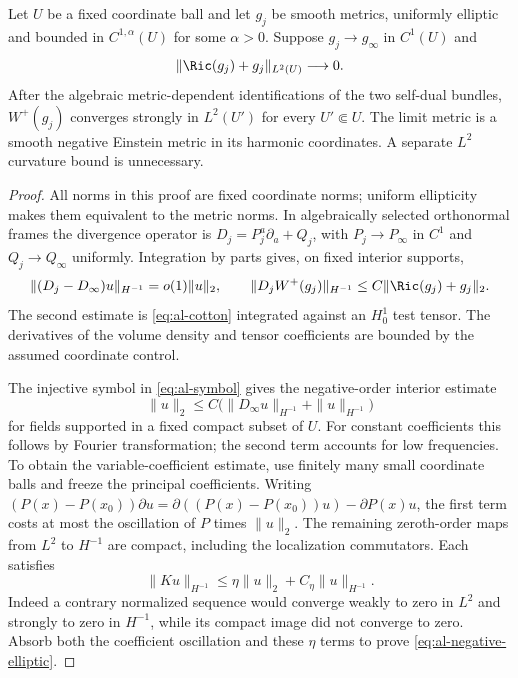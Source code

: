 \begin{proposition}
\label{prop:al-chart-transfer}
Let $U$ be a fixed coordinate ball and let $g_j$ be smooth metrics,
uniformly elliptic and bounded in $C^{1,\alpha}(U)$ for some $\alpha>0$.
Suppose $g_j\to g_\infty$ in $C^1(U)$ and
\[
 \|\Ric(g_j)+g_j\|_{L^2(U)}\longrightarrow0.
\]
After the algebraic metric-dependent identifications of the two self-dual
bundles, $W^+(g_j)$ converges strongly in $L^2(U')$ for every $U'\Subset U$.
The limit metric is a smooth negative Einstein metric in its harmonic
coordinates.  A separate $L^2$ curvature bound is unnecessary.
\end{proposition}

\begin{proof}
All norms in this proof are fixed coordinate norms; uniform ellipticity
makes them equivalent to the metric norms.  In algebraically selected
orthonormal frames the divergence operator is
$D_j=P_j^a\partial_a+Q_j$, with $P_j\to P_\infty$ in $C^1$ and
$Q_j\to Q_\infty$ uniformly.  Integration by parts gives, on fixed
interior supports,
\begin{equation}\label{eq:al-operator-convergence}
 \|(D_j-D_\infty)u\|_{H^{-1}}=o(1)\|u\|_2,
 \qquad \|D_jW^+(g_j)\|_{H^{-1}}
       \le C\|\Ric(g_j)+g_j\|_2.
\end{equation}
The second estimate is \eqref{eq:al-cotton} integrated against an $H^1_0$
test tensor.  The derivatives of the volume density and tensor
coefficients are bounded by the assumed coordinate control.

The injective symbol in \eqref{eq:al-symbol} gives the negative-order
interior estimate
\begin{equation}\label{eq:al-negative-elliptic}
 \|u\|_2\le C\bigl(\|D_\infty u\|_{H^{-1}}
                           +\|u\|_{H^{-1}}\bigr)
\end{equation}
for fields supported in a fixed compact subset of $U$.  For constant
coefficients this follows by Fourier transformation; the second term
accounts for low frequencies.  To obtain the variable-coefficient
estimate, use finitely many small coordinate balls and freeze the
principal coefficients.  Writing
$(P(x)-P(x_0))\partial u
=\partial((P(x)-P(x_0))u)-\partial P(x)u$,
the first term costs at most the oscillation of $P$ times $\|u\|_2$.
The remaining zeroth-order maps from $L^2$ to $H^{-1}$ are compact,
including the localization commutators.  Each satisfies
\[
 \|Ku\|_{H^{-1}}\le\eta\|u\|_2+C_\eta\|u\|_{H^{-1}}.
\]
Indeed a contrary normalized sequence would converge weakly to zero
in $L^2$ and strongly to zero in $H^{-1}$, while its compact image did
not converge to zero.  Absorb both the coefficient oscillation and these
$\eta$ terms to prove \eqref{eq:al-negative-elliptic}.


\end{proof}
